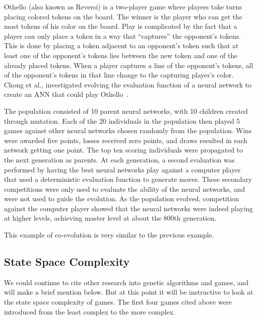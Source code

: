Othello (also known as Reversi) is a two-player game where players take turns
placing colored tokens on the board. The winner is the player who can get the
most tokens of his color on the board. Play is complicated by the fact that a
player can only place a token in a way that ``captures'' the opponent's tokens.
This is done by placing a token adjacent to an opponent's token such that at
least one of the opponent's tokens lies between the new token and one of the
already placed tokens. When a player captures a line of the opponent's tokens,
all of the opponent's tokens in that line change to the capturing player's
color. Chong et al., investigated evolving the evaluation function of a neural
network to create an ANN that could play Othello~\cite{ChongTW05}.

The population consisted of 10 parent neural networks, with 10 children created
through mutation. Each of the 20 individuals in the population then played 5
games against other neural networks chosen randomly from the population. Wins
were awarded five points, losses received zero points, and draws resulted in
each network getting one point. The top ten scoring individuals were propagated
to the next generation as parents. At each generation, a second evaluation was
performed by having the best neural networks play against a computer player that
used a deterministic evaluation function to generate moves. These secondary
competitions were only used to evaluate the ability of the neural networks, and
were not used to guide the evolution. As the population evolved, competition
against the computer player showed that the neural networks were indeed playing
at higher levels, achieving master level at about the 800th generation.

This example of co-evolution is very similar to the previous example.

\subsection{State Space Complexity}
We could continue to cite other research into genetic algorithms and games, and
will make a brief mention below. But at this point it will be instructive to
look at the state space complexity of games. The first four games cited above
were introduced from the least complex to the more complex.

